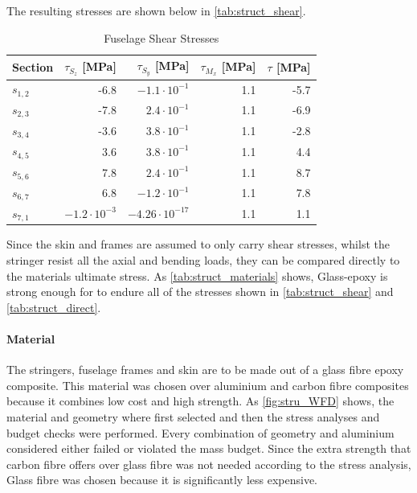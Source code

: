 The resulting stresses are shown below in \autoref{tab:struct_shear}. 
\begin{table}[htbp]
  \centering
  \caption{Fuselage Shear Stresses}
    \begin{tabular}{lrrrr}
    \toprule
    \bfseries Section      &\bfseries $\tau_{S_{z}}$ [MPa]&\bfseries $\tau_{S_{y}}$ [MPa]    &\bfseries $\tau_{M_{x}}$ [MPa] &\bfseries $\tau$ [MPa] \\
    \midrule
    $s_{1,2}$  &  -6.8 & $-1.1\cdot 10^{-1}$ & 1.1 & -5.7  \\
    $s_{2,3}$  & -7.8 & $2.4\cdot 10^{-1}$ &  1.1 & -6.9\\
    $s_{3,4}$  & -3.6 & $3.8\cdot 10^{-1}$ &  1.1 & -2.8\\
    $s_{4,5}$  &  3.6 & $3.8\cdot 10^{-1}$ & 1.1 &  4.4\\
    $s_{5,6}$  & 7.8 &  $2.4\cdot 10^{-1}$ &  1.1 & 8.7\\
    $s_{6,7}$  & 6.8 &  $-1.2\cdot 10^{-1}$ &  1.1 & 7.8\\
    $s_{7,1}$  & $-1.2\cdot 10^{-3}$& $-4.26\cdot 10^{-17}$  & 1.1 & 1.1\\
    \bottomrule
    \end{tabular}%
  \label{tab:struct_shear}%
\end{table}%
Since the skin and frames are assumed to only carry shear stresses, whilst the stringer resist all the axial and bending loads, they can be compared directly to the materials ultimate stress. As \autoref{tab:struct_materials} shows, Glass-epoxy is strong enough for to endure all of the stresses shown in \autoref{tab:struct_shear} and \autoref{tab:struct_direct}.

\paragraph{Material}

The stringers, fuselage frames and skin are to be made out of a glass fibre epoxy composite. This material was chosen over aluminium and carbon fibre composites because it combines low cost and high strength. As \autoref{fig:stru_WFD} shows, the material and geometry where first selected and then the stress analyses and budget checks were performed. Every combination of geometry and aluminium considered either failed or violated the mass budget. Since the extra strength that carbon fibre offers over glass fibre was not needed according to the stress analysis, Glass fibre was chosen because it is significantly less expensive.

